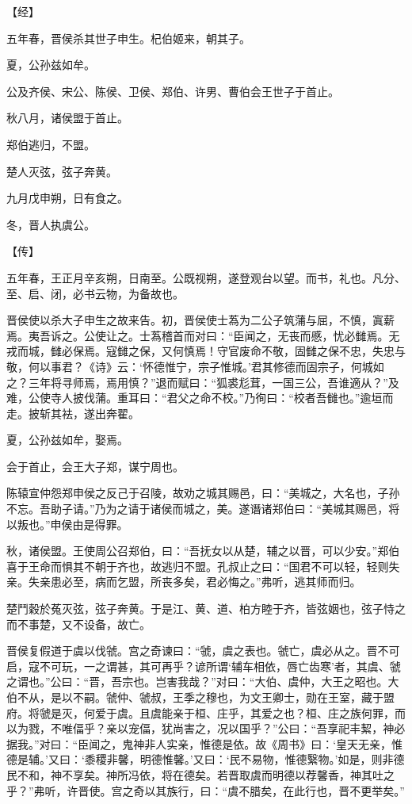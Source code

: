 \documentclass[a4paper,12pt,UTF8,twoside]{ctexbook}
\begin{document}
【经】

五年春，晋侯杀其世子申生。杞伯姬来，朝其子。

夏，公孙兹如牟。

公及齐侯、宋公、陈侯、卫侯、郑伯、许男、曹伯会王世子于首止。

秋八月，诸侯盟于首止。

郑伯逃归，不盟。

楚人灭弦，弦子奔黄。

九月戊申朔，日有食之。

冬，晋人执虞公。

【传】

五年春，王正月辛亥朔，日南至。公既视朔，遂登观台以望。而书，礼也。凡分、至、启、闭，必书云物，为备故也。

晋侯使以杀大子申生之故来告。初，晋侯使士蒍为二公子筑蒲与屈，不慎，寘薪焉。夷吾诉之。公使让之。士蒍稽首而对曰：“臣闻之，无丧而慼，忧必雠焉。无戎而城，雠必保焉。寇雠之保，又何慎焉！守官废命不敬，固雠之保不忠，失忠与敬，何以事君？《诗》云：‘怀德惟宁，宗子惟城。’君其修德而固宗子，何城如之？三年将寻师焉，焉用慎？”退而赋曰：“狐裘尨茸，一国三公，吾谁適从？”及难，公使寺人披伐蒲。重耳曰：“君父之命不校。”乃徇曰：“校者吾雠也。”逾垣而走。披斩其袪，遂出奔翟。

夏，公孙兹如牟，娶焉。

会于首止，会王大子郑，谋宁周也。

陈辕宣仲怨郑申侯之反己于召陵，故劝之城其赐邑，曰：“美城之，大名也，子孙不忘。吾助子请。”乃为之请于诸侯而城之，美。遂谮诸郑伯曰：“美城其赐邑，将以叛也。”申侯由是得罪。

秋，诸侯盟。王使周公召郑伯，曰：“吾抚女以从楚，辅之以晋，可以少安。”郑伯喜于王命而惧其不朝于齐也，故逃归不盟。孔叔止之曰：“国君不可以轻，轻则失亲。失亲患必至，病而乞盟，所丧多矣，君必悔之。”弗听，逃其师而归。

楚鬥穀於菟灭弦，弦子奔黄。于是江、黄、道、柏方睦于齐，皆弦姻也，弦子恃之而不事楚，又不设备，故亡。

晋侯复假道于虞以伐虢。宫之奇谏曰：“虢，虞之表也。虢亡，虞必从之。晋不可启，寇不可玩，一之谓甚，其可再乎？谚所谓‘辅车相依，唇亡齿寒’者，其虞、虢之谓也。”公曰：“晋，吾宗也。岂害我哉？”对曰：“大伯、虞仲，大王之昭也。大伯不从，是以不嗣。虢仲、虢叔，王季之穆也，为文王卿士，勋在王室，藏于盟府。将虢是灭，何爱于虞。且虞能亲于桓、庄乎，其爱之也？桓、庄之族何罪，而以为戮，不唯偪乎？亲以宠偪，犹尚害之，况以国乎？”公曰：“吾享祀丰絜，神必据我。”对曰：“臣闻之，鬼神非人实亲，惟德是依。故《周书》曰：‘皇天无亲，惟德是辅。’又曰：‘黍稷非馨，明德惟馨。’又曰：‘民不易物，惟德繄物。’如是，则非德民不和，神不享矣。神所冯依，将在德矣。若晋取虞而明德以荐馨香，神其吐之乎？”弗听，许晋使。宫之奇以其族行，曰：“虞不腊矣，在此行也，晋不更举矣。”
\end{document}
